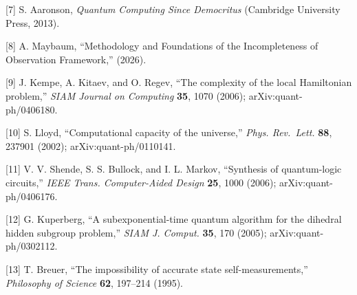 \documentclass[
]{article}
\begin{document}
{[}7{]} S. Aaronson, \emph{Quantum Computing Since Democritus}
(Cambridge University Press, 2013).

{[}8{]} A. Maybaum, ``Methodology and Foundations of the Incompleteness
of Observation Framework,'' (2026).

{[}9{]} J. Kempe, A. Kitaev, and O. Regev, ``The complexity of the local
Hamiltonian problem,'' \emph{SIAM Journal on Computing} \textbf{35},
1070 (2006); arXiv:quant-ph/0406180.

{[}10{]} S. Lloyd, ``Computational capacity of the universe,''
\emph{Phys. Rev.~Lett.} \textbf{88}, 237901 (2002);
arXiv:quant-ph/0110141.

{[}11{]} V. V. Shende, S. S. Bullock, and I. L. Markov, ``Synthesis of
quantum-logic circuits,'' \emph{IEEE Trans. Computer-Aided Design}
\textbf{25}, 1000 (2006); arXiv:quant-ph/0406176.

{[}12{]} G. Kuperberg, ``A subexponential-time quantum algorithm for the
dihedral hidden subgroup problem,'' \emph{SIAM J. Comput.} \textbf{35},
170 (2005); arXiv:quant-ph/0302112.

{[}13{]} T. Breuer, ``The impossibility of accurate state
self-measurements,'' \emph{Philosophy of Science} \textbf{62}, 197--214
(1995).
\end{document}

